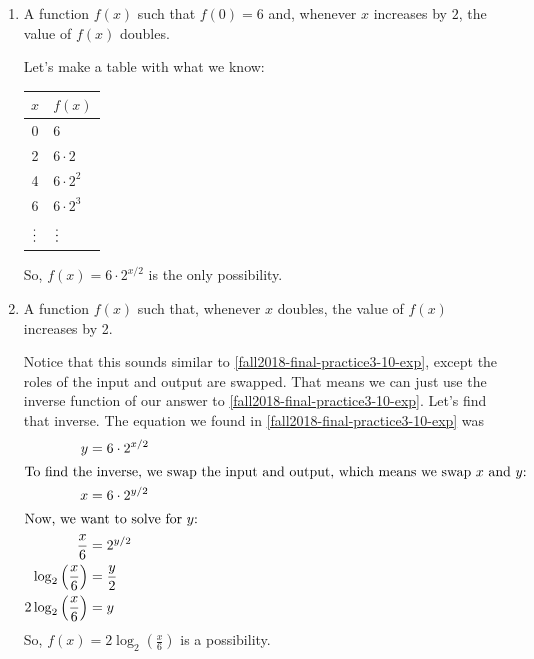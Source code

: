 \documentclass{article}
\theoremstyle{theorem}
\begin{document}
\begin{enumerate}
\begin{enumerate}
  \item \label{fall2018-final-practice3-10-exp}
    \begin{problem}[\vfill]
      A function $f(x)$ such that $f(0) = 6$ and, whenever $x$ increases by $2$, the value of $f(x)$ doubles. 
    \end{problem}

    \begin{solution}
      Let's make a table with what we know:
      \begin{center}
        \begin{tabular}{c | l}
          $x$ & $f(x)$ \\
          \hline
          0 & 6 \\
          2 & $6 \cdot 2$ \\
          4 & $6 \cdot 2^2$ \\
          6 & $6 \cdot 2^3$ \\
          $\mathrel{\makebox[\widthof{6}]{\vdots}}$ & $\mathrel{\makebox[\widthof{6}]{\vdots}}$
        \end{tabular}
      \end{center}
      So, $\boxed{f(x) = 6 \cdot 2^{x/2}}$ is the only possibility. 
    \end{solution} 

  \item %

    \begin{problem}[\vfill\newpage]
      A function $f(x)$ such that, whenever $x$ doubles, the value of $f(x)$ increases by 2.
    \end{problem}

    \begin{solution}
      Notice that this sounds similar to \ref{fall2018-final-practice3-10-exp}, except the roles of the input and output are swapped. That means we can just use the inverse function of our answer to \ref{fall2018-final-practice3-10-exp}. Let's find that inverse. The equation we found in \ref{fall2018-final-practice3-10-exp} was
      \begin{align*}
        y &= 6 \cdot 2^{x/2} \\
        \intertext{To find the inverse, we swap the input and output, which means we swap $x$ and $y$:}
        x &= 6 \cdot 2^{y / 2} \\
        \intertext{Now, we want to solve for $y$:}
        \frac{x}{6} &= 2^{y/2} \\
        \log_2 \left( \frac{x}{6} \right) &= \frac{y}{2} \\
        2 \log_2 \left( \frac{x}{6} \right) &= y
      \end{align*}
      So, $\boxed{f(x) = 2 \log_2 \left( \frac{x}{6} \right)}$ is a possibility. 
    \end{solution}


\end{enumerate}
\end{enumerate}
\end{document}
